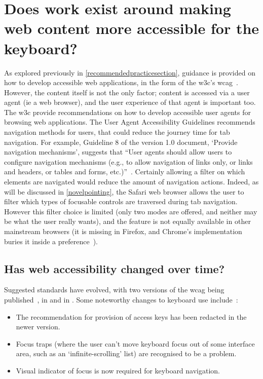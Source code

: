 \documentclass[11pt,openright,a4paper]{report}
\begin{document}
\section{Does work exist around making web content more accessible for the keyboard?}
\label{makingwebcontentkeyboardaccessible}
As explored previously in \cref{recommendedpracticesection}, guidance is provided on how to develop accessible web applications, in the form of the \gls{w3c}'s \gls{wcag}~\cite{chisholm2001web,wcag}. However, the content itself is not the only factor; content is accessed via a user agent (ie a web browser), and the user experience of that agent is important too. The \gls{w3c} provide recommendations on how to develop accessible user agents for browsing web applications\cite{jacobs2000user,allan2010user}. The User Agent Accessibility Guidelines recommends navigation methods for users, that could reduce the journey time for tab navigation. For example, Guideline 8 of the version 1.0 document, `Provide navigation mechanisms', suggests that ``User agents should allow users to configure navigation mechanisms (e.g., to allow navigation of links only, or links and headers, or tables and forms, etc.)''~\parencite[][p.17]{jacobs2000user}. Certainly allowing a filter on which elements are navigated would reduce the amount of navigation actions. Indeed, as will be discussed in \cref{novelpointing}, the Safari web browser allows the user to filter which types of focusable controls are traversed during tab navigation. However this filter choice is limited (only two modes are offered, and neither may be what the user really wants), and the feature is not equally available in other mainstream browsers (it is missing in Firefox, and Chrome's implementation buries it inside a preference~\cite{browserkeyboardaccess}).
\subsection{Has web accessibility changed over time?}
Suggested standards have evolved, with two versions of the \gls{wcag} being published~\cite{chisholm2001web,wcag}, in \citeyear{chisholm2001web} and in \citeyear{wcag}. Some noteworthy changes to keyboard use include~\cite{wcagcomparison}:
\begin{itemize}
\item The recommendation for provision of access keys has been redacted in the newer version.
\item Focus traps (where the user can't move keyboard focus out of some interface area, such as an `infinite-scrolling' list) are recognised to be a problem.
\item Visual indicator of focus is now required for keyboard navigation.
\end{itemize}
\end{document}
